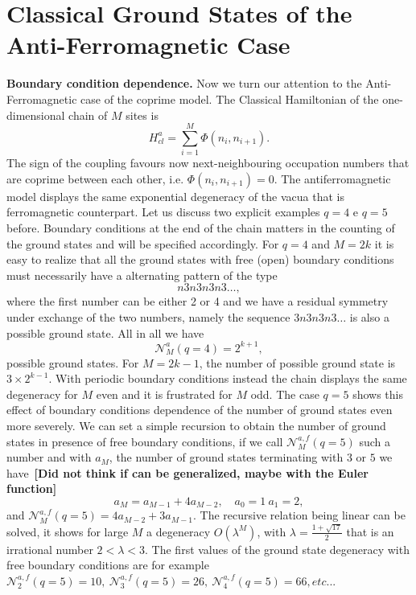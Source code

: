 \documentclass[aps,pra,superscriptaddress]{revtex4}
\renewcommand{\(}{\left(}
\renewcommand{\)}{\right)}
\renewcommand{\[}{\left[}
\renewcommand{\]}{\right]}
\begin{document}
\section{Classical Ground States of the Anti-Ferromagnetic Case}
\noindent
{\bf Boundary condition dependence.}
Now we turn our attention to the Anti-Ferromagnetic case of the coprime model.
The Classical Hamiltonian of the one-dimensional chain of $M$ sites is
\begin{equation}
 H^a_{cl}=\sum_{i=1}^M\Phi(n_i,n_{i+1}).
\end{equation}
The sign of the coupling favours now next-neighbouring occupation numbers that are coprime between each other, i.e. $\Phi(n_i,n_{i+1})=0$. The antiferromagnetic model displays the same
exponential degeneracy of the vacua that is ferromagnetic counterpart. Let us discuss two explicit examples $q=4$ e $q=5$ before.
Boundary conditions at the end of the chain matters in the counting of
the ground states and will be specified accordingly.
For $q=4$ and $M=2k$ it is easy to realize that all the ground states with free (open) boundary conditions must necessarily have a alternating pattern of the type
\begin{equation}
 n3n3n3n3\dots,
\end{equation}
where the first number can be either 2 or 4 and we have a residual symmetry under exchange of the two numbers, namely the sequence
$3n3n3n3\dots$ is also a possible ground state. All in all we have
\begin{equation}
 \mathcal{N}^{a}_M(q=4)=2^{k+1},
\end{equation}
possible ground states. For $M=2k-1$, the number of possible ground state is $3\times 2^{k-1}$. With periodic boundary
conditions instead the
chain displays the same degeneracy for $M$ even and it is frustrated for $M$ odd. The case $q=5$ shows this effect of boundary conditions 
dependence of the number of ground states even more severely. We can set a simple recursion to obtain the number of ground states in presence
of free boundary conditions, if we call $\mathcal{N}^{a,f}_M(q=5)$ such a number and with $a_M$, the number of ground states terminating with
$3$ or $5$ we have~\textbf{[Did not think if can be generalized, maybe with the Euler function]} 
\begin{equation}
 a_{M}=a_{M-1}+4a_{M-2},\quad a_{0}=1~a_{1}=2,
\end{equation}
and $\mathcal{N}^{a,f}_M(q=5)=4a_{M-2}+3a_{M-1}$. The recursive
relation being linear can be solved, it shows for large $M$ a degeneracy $O\left(\lambda^M\right)$, with
$\lambda=\frac{1+\sqrt{17}}{2}$ that is an irrational number $2<\lambda<3$. The first values of the ground state degeneracy with free boundary
conditions are for example
$\mathcal{N}^{a,f}_2(q=5)=10,~\mathcal{N}^{a,f}_3(q=5)=26,~\mathcal{N}^{a,f}_4(q=5)=66, etc...$
\end{document}
